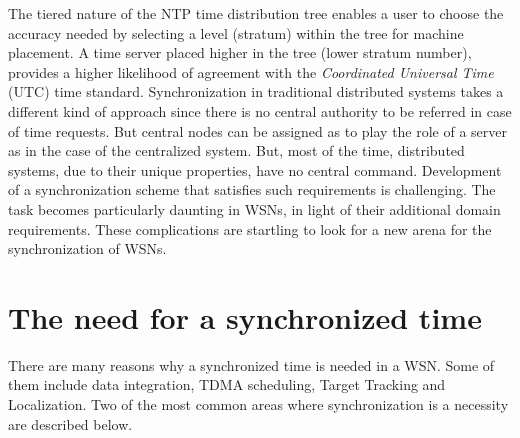 \documentclass[a4paper,10pt]{report}
\begin{document}
The tiered nature of the NTP time distribution tree enables a user to choose the accuracy needed by selecting a level (stratum) within
the tree for machine placement. A time server placed higher in the tree (lower stratum number), provides a higher likelihood of
agreement with the \textit{Coordinated Universal Time} (UTC) time standard.
\newline
Synchronization in traditional distributed systems takes a different kind of approach since there is no central authority to be referred
in case of time requests. But central nodes can be assigned as to play the role of a server as in the case of the centralized system.
But, most of the time, distributed systems, due to their unique properties, have no central command. Development of a synchronization
scheme that satisfies such requirements is challenging. The task becomes particularly daunting in WSNs, in light of their additional
domain requirements. These complications are startling to look for a new arena for the synchronization of WSNs.
\section{\textbf{The need for a synchronized time}}
There are many reasons why a synchronized time is needed in a WSN. Some of them include data integration, TDMA scheduling, Target
Tracking and Localization. Two of the most common areas where synchronization is a necessity are described below. 
\end{document}
